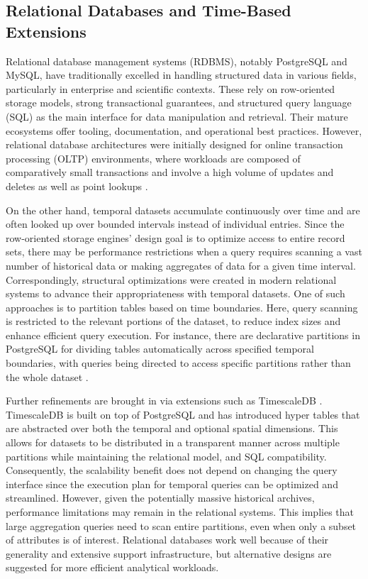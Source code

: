 \subsection{Relational Databases and Time-Based Extensions }

Relational database management systems (RDBMS), notably PostgreSQL and MySQL, have traditionally excelled in handling structured data in various fields, particularly in enterprise and scientific contexts. These rely on row-oriented storage models, strong transactional guarantees, and structured query language (SQL) as the main interface for data manipulation and retrieval. Their mature ecosystems offer tooling, documentation, and operational best practices. However, relational database architectures were initially designed for online transaction processing (OLTP) environments, where workloads are composed of comparatively small transactions and involve a high volume of updates and deletes as well as point lookups \cite{ordonez2018survey}.

On the other hand, temporal datasets accumulate continuously over time and are often looked up over bounded intervals instead of individual entries. Since the row-oriented storage engines' design goal is to optimize access to entire record sets, there may be performance restrictions when a query requires scanning a vast number of historical data or making aggregates of data for a given time interval. Correspondingly, structural optimizations were created in modern relational systems to advance their appropriateness with temporal datasets. One of such approaches is to partition tables based on time boundaries. Here, query scanning is restricted to the relevant portions of the dataset, to reduce index sizes and enhance efficient query execution. For instance, there are declarative partitions in PostgreSQL for dividing tables automatically across specified temporal boundaries, with queries being directed to access specific partitions rather than the whole dataset \cite{postgresql_partitioning}.


Further refinements are brought in via extensions such as TimescaleDB \cite{timescaledb2017}. TimescaleDB is built on top of PostgreSQL and has introduced hyper tables that are abstracted over both the temporal and optional spatial dimensions. This allows for datasets to be distributed in a transparent manner across multiple partitions while maintaining the relational model, and SQL compatibility. Consequently, the scalability benefit does not depend on changing the query interface since the execution plan for temporal queries can be optimized and streamlined. However, given the potentially massive historical archives, performance limitations may remain in the relational systems. This implies that large aggregation queries need to scan entire partitions, even when only a subset of attributes is of interest. Relational databases work well because of their generality and extensive support infrastructure, but alternative designs are suggested for more efficient analytical workloads.


